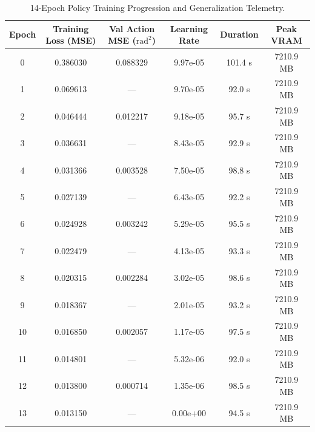 \begin{table}[htbp]
\centering
\caption{14-Epoch Policy Training Progression and Generalization Telemetry.}
\label{tab:training_progression}
\begin{tabular}{cccccc}
\toprule
\textbf{Epoch} & \textbf{Training Loss (MSE)} & \textbf{Val Action MSE ($\text{rad}^2$)} & \textbf{Learning Rate} & \textbf{Duration} & \textbf{Peak VRAM} \\
\midrule
0 & 0.386030 & 0.088329 & 9.97e-05 & 101.4 s & 7210.9 MB \\
1 & 0.069613 & --- & 9.70e-05 & 92.0 s & 7210.9 MB \\
2 & 0.046444 & 0.012217 & 9.18e-05 & 95.7 s & 7210.9 MB \\
3 & 0.036631 & --- & 8.43e-05 & 92.9 s & 7210.9 MB \\
4 & 0.031366 & 0.003528 & 7.50e-05 & 98.8 s & 7210.9 MB \\
5 & 0.027139 & --- & 6.43e-05 & 92.2 s & 7210.9 MB \\
6 & 0.024928 & 0.003242 & 5.29e-05 & 95.5 s & 7210.9 MB \\
7 & 0.022479 & --- & 4.13e-05 & 93.3 s & 7210.9 MB \\
8 & 0.020315 & 0.002284 & 3.02e-05 & 98.6 s & 7210.9 MB \\
9 & 0.018367 & --- & 2.01e-05 & 93.2 s & 7210.9 MB \\
10 & 0.016850 & 0.002057 & 1.17e-05 & 97.5 s & 7210.9 MB \\
11 & 0.014801 & --- & 5.32e-06 & 92.0 s & 7210.9 MB \\
12 & 0.013800 & 0.000714 & 1.35e-06 & 98.5 s & 7210.9 MB \\
13 & 0.013150 & --- & 0.00e+00 & 94.5 s & 7210.9 MB \\
\bottomrule
\end{tabular}
\end{table}
